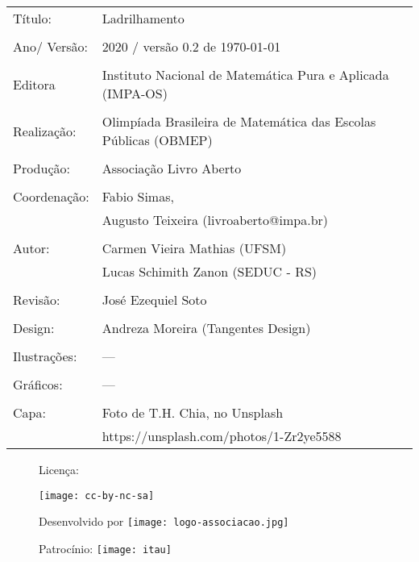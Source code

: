 \begin{tabular}{p{}p{}}
Título: & Ladrilhamento\\
\\
Ano/ Versão: & 2020 / versão 0.2 de \today\\
\\
Editora & Instituto Nacional de Matem\'atica Pura e Aplicada (IMPA-OS)\\
\\
Realização:& Olimp\'iada Brasileira de Matem\'atica das Escolas P\'ublicas (OBMEP)\\
\\
Produção:& Associação Livro Aberto\\
\\
Coordenação: & Fabio Simas, \\
			&  Augusto Teixeira (livroaberto@impa.br)\\
\\
  Autor: & Carmen Vieira Mathias (UFSM) \\
         & Lucas Schimith Zanon (SEDUC - RS) \\
\\
Revisão: & José Ezequiel Soto  \\
\\
Design: & Andreza Moreira (Tangentes Design) \\
\\
  Ilustrações: & --- \\ 
\\
Gráficos: & --- \\
\\
  Capa: & Foto de T.H. Chia, no Unsplash \\
  		& https://unsplash.com/photos/1-Zr2ye5588 \\

\end{tabular}


\begin{figure}[b]
\begin{minipage}[l]{5cm}
\centering

{\large Licença:}

  \texttt{[image: cc-by-nc-sa]}
\end{minipage}\hfill
\begin{minipage}[c]{5cm}
\centering
{\large Desenvolvido por}
\texttt{[image: logo-associacao.jpg]}
\end{minipage}
\begin{minipage}[r]{5cm}
\centering

{\large Patrocínio:}
  \vspace{1em}
  \texttt{[image: itau]}
\end{minipage}
\end{figure}

